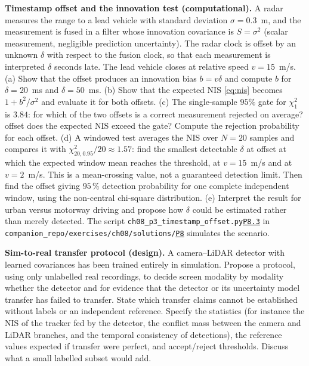 \documentclass[graybox,envcountchap]{style/SNmono}
\newcommand{\repopath}[1]{\texttt{#1}}
\providecommand{\DIFadd}[1]{{\protect\color{blue} #1}} %
\providecommand{\DIFdel}[1]{{\protect\color{red} #1}} %
\providecommand{\DIFaddbegin}{} %
\providecommand{\DIFaddend}{} %
\providecommand{\DIFdelbegin}{} %
\providecommand{\DIFdelend}{} %
\DeclareRobustCommand{\RtwoDel}[1]{{\color{red}%
  \renewcommand{\DIFadd}[1]{##1}\renewcommand{\DIFdel}[1]{##1}%
  #1}}
\DeclareRobustCommand{\RtwoAdd}[1]{{\color{blue}#1}}
\DeclareRobustCommand{\codeentry}[1]{\hyperref[code:#1]{\texttt{#1}}}
\begin{document}
\begin{prob}\label{prob:ch08:3}
\textbf{Timestamp offset and the innovation test (computational).} A radar measures the range to a lead vehicle with standard deviation $\sigma=0.3$~m, and the measurement is fused in a filter whose innovation covariance is $S=\sigma^2$ (scalar measurement, negligible prediction uncertainty). The radar clock is offset by an unknown $\delta$ with respect to the fusion clock, so that each measurement is interpreted $\delta$ seconds late. The lead vehicle closes at relative speed $v=15$~m/s. (a) Show that the offset produces an innovation bias $b=v\delta$ and compute $b$ for $\delta=20$~ms and $\delta=50$~ms. (b) Show that the expected NIS \eqref{eq:nis} becomes $1+b^2/\sigma^2$ and evaluate it for both offsets. (c) The single-sample $95\%$ gate for $\chi^2_1$ is $3.84$: for which \DIFdelbegin \DIFdel{of the two offsets is a correct measurement rejected on average? }\DIFdelend \DIFaddbegin \DIFadd{offset does the expected NIS exceed the gate? Compute the rejection probability for each offset. }\DIFaddend (d) A windowed test averages the NIS over $N=20$ samples and compares it with $\chi^2_{20,0.95}/20\approx1.57$: find the \DIFdelbegin \DIFdel{smallest detectable $\delta$ at }\DIFdelend \DIFaddbegin \DIFadd{offset at which the expected window mean reaches the threshold, at }\DIFaddend $v=15$~m/s and at $v=2$~m/s. \DIFaddbegin \DIFadd{This is a mean-crossing value, not a guaranteed detection limit. Then find the offset giving $95\,\%$ detection probability for one complete independent window, using the non-central chi-square distribution. }\DIFaddend (e) Interpret the result for urban versus motorway driving and propose how $\delta$ could be estimated rather than merely detected. The script \RtwoDel{\repopath{ch08\_\allowbreak p3\_\allowbreak timestamp\_\allowbreak offset.py}}\RtwoAdd{\codeentry{P8.3}} in \RtwoDel{\repopath{companion\_\allowbreak repo/\allowbreak exercises/\allowbreak ch08/\allowbreak solutions/\allowbreak }}\RtwoAdd{\codeentry{P8}} simulates the scenario.
\end{prob}

\begin{prob}\label{prob:ch08:4}
\textbf{Sim-to-real transfer protocol (design).} A camera--LiDAR detector with learned covariances has been trained entirely in simulation. Propose a protocol, using only unlabelled real recordings, to \DIFdelbegin \DIFdel{decide }\DIFdelend \DIFaddbegin \DIFadd{screen }\DIFaddend modality by modality \DIFdelbegin \DIFdel{whether the detector and }\DIFdelend \DIFaddbegin \DIFadd{for evidence that the detector or }\DIFaddend its uncertainty model \DIFdelbegin \DIFdel{transfer}\DIFdelend \DIFaddbegin \DIFadd{has failed to transfer. State which transfer claims cannot be established without labels or an independent reference}\DIFaddend . Specify the statistics (for instance the NIS of the tracker fed by the detector, the conflict mass between the camera and LiDAR branches, and the temporal consistency of detections), the reference values expected if transfer were perfect, and accept/reject thresholds. Discuss what a small labelled subset would add.
\end{prob}
\end{document}

